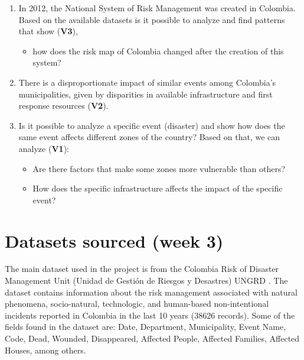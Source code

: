 \documentclass[11pt]{article}
\begin{document}
\begin{enumerate}


\item{In 2012, the National System of Risk Management was created in Colombia. Based on the available datasets is it possible to analyze and find patterns that show (\textbf{V3}),
\begin{itemize}
\item how does the risk map of Colombia changed after the creation of this system?
\end{itemize}
}


\item{There is a disproportionate impact of similar events among Colombia's municipalities, given by disparities in available infrastructure and first response resources  (\textbf{V2}).}


\item{Is it possible to analyze a specific event (disaster) and show how does the same event  affects different zones of the country? Based on that, we can analyze (\textbf{V1}):
\begin{itemize}
\item Are there factors that make some zones more vulnerable than others?
\item How does the specific infrastructure affects the impact of the specific event?
\end{itemize}
}
\end{enumerate}



\section{Datasets sourced (week 3)}
\label{sec:app}

The main dataset used in the project is from the Colombia Risk of Disaster Management Unit (Unidad de Gesti\'{o}n de Riesgos y Desastres) UNGRD \cite{datasetUNGRD}. The dataset contains information about  the risk management associated with natural phenomena, socio-natural, technologic, and human-based non-intentional incidents reported in Colombia in the last 10 years (38626 records). Some of the fields found in the dataset are: Date, Department, Municipality, Event Name, Code, Dead, Wounded, Disappeared, Affected People, Affected Families, Affected Houses, among others.
\end{document}
